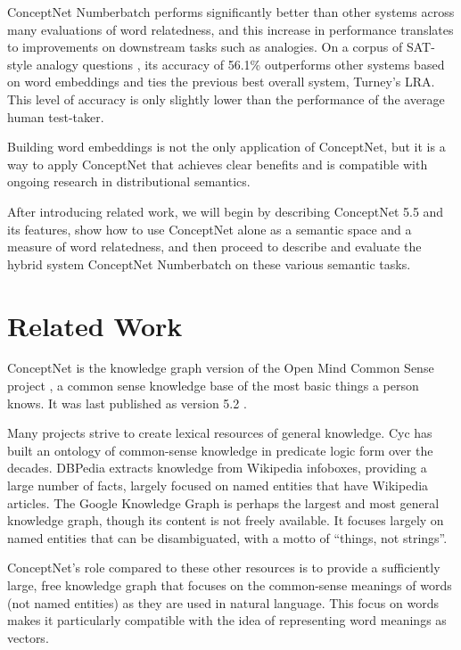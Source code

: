 \documentclass[letterpaper]{article}
\begin{document}
ConceptNet Numberbatch performs significantly better than other systems across
many evaluations of word relatedness, and this increase in performance
translates to improvements on downstream tasks such as analogies.  On a
corpus of SAT-style analogy questions \cite{turney2006lra}, its accuracy of
56.1\% outperforms other systems based on word embeddings and ties the
previous best overall system, Turney's LRA. This level of accuracy is only
slightly lower than the performance of the average human test-taker.

Building word embeddings is not the only application of ConceptNet, but it is a
way to apply ConceptNet that achieves clear benefits and is compatible with
ongoing research in distributional semantics.

After introducing related work, we will begin by describing ConceptNet 5.5 and
its features, show how to use ConceptNet alone as a semantic space and a
measure of word relatedness, and then proceed to describe and evaluate the
hybrid system ConceptNet Numberbatch on these various semantic tasks.

\section{Related Work}

ConceptNet is the knowledge graph version of the Open Mind
Common Sense project \cite{singh2002omcs}, a common sense knowledge base
of the most basic things a person knows. It was last published as version
5.2 \cite{speer2013conceptnet}.

Many projects strive to create lexical resources of general knowledge.  Cyc
\cite{lenat1989cyc} has built an ontology of common-sense knowledge in
predicate logic form over the decades. DBPedia \cite{auer2007dbpedia} extracts
knowledge from Wikipedia infoboxes, providing a large number of facts, largely
focused on named entities that have Wikipedia articles. The Google Knowledge
Graph \cite{singhal2012googleblog} is perhaps the largest and most general
knowledge graph, though its content is not freely available. It focuses largely
on named entities that can be disambiguated, with a motto of ``things, not
strings''.

ConceptNet's role compared to these other resources is to provide a
sufficiently large, free knowledge graph that focuses on the common-sense
meanings of words (not named entities) as they are used in natural language.
This focus on words makes it particularly compatible with the idea of
representing word meanings as vectors.
\end{document}
